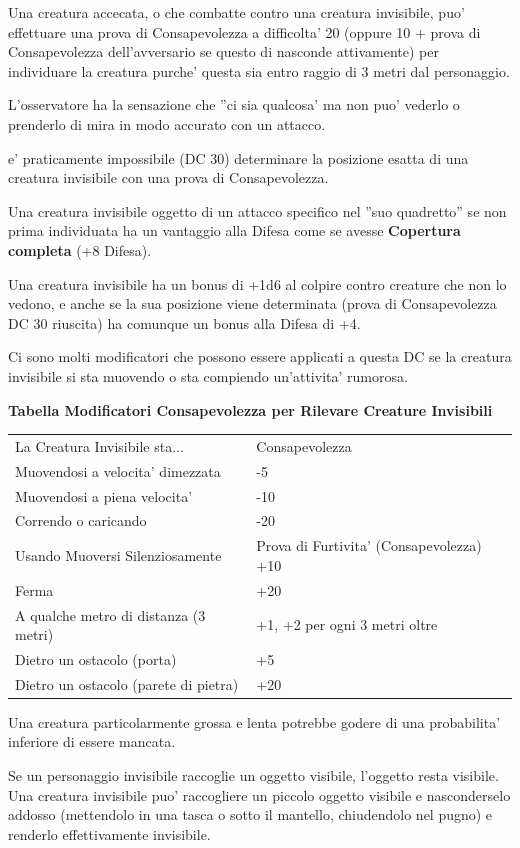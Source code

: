 \documentclass[a4paper,11pt,twoside,openany]{book}
\begin{document}
	Una creatura accecata, o che combatte contro una creatura invisibile, puo' effettuare una prova di Consapevolezza a difficolta' 20 (oppure 10 + prova di Consapevolezza dell'avversario se questo di nasconde attivamente) per individuare la creatura purche' questa sia entro raggio di 3 metri dal personaggio.
	
	L'osservatore ha la sensazione che ''ci sia qualcosa' ma non puo' vederlo o prenderlo di mira in modo accurato con un attacco.
	
	e' praticamente impossibile (DC 30) determinare la posizione esatta di una creatura invisibile con una prova di Consapevolezza.
	
	Una creatura invisibile oggetto di un attacco specifico nel ''suo quadretto'' se non prima individuata ha un vantaggio alla Difesa come se avesse \textbf{Copertura completa} (+8 Difesa).
	
	Una creatura invisibile ha un bonus di +1d6 al colpire contro creature che non lo vedono, e anche se la sua posizione viene determinata (prova di Consapevolezza DC 30 riuscita) ha comunque un bonus alla Difesa di +4.
	
	Ci sono molti modificatori che possono essere applicati a questa DC se la creatura invisibile si sta muovendo o sta compiendo un'attivita' rumorosa.
	
	\bigskip
	
	\textbf{Tabella Modificatori Consapevolezza per Rilevare Creature Invisibili}
	
	\medskip
	
	\begin{tabular}{ll}
		\toprule
		La Creatura Invisibile sta... & Consapevolezza\tabularnewline
		Muovendosi a velocita' dimezzata & -5\tabularnewline
		Muovendosi a piena velocita' & -10\tabularnewline
		Correndo o caricando & -20\tabularnewline
		Usando Muoversi Silenziosamente & Prova di Furtivita' (Consapevolezza) +10\tabularnewline
		Ferma & +20\tabularnewline
		A qualche metro di distanza (3 metri) & +1, +2 per ogni 3 metri oltre\tabularnewline
		Dietro un ostacolo (porta) & +5\tabularnewline
		Dietro un ostacolo (parete di pietra) & +20\tabularnewline
		
	\end{tabular}
	
	\bigskip
	
	Una creatura particolarmente grossa e lenta potrebbe godere di una probabilita' inferiore di essere mancata.
	
	Se un personaggio invisibile raccoglie un oggetto visibile, l'oggetto resta visibile. Una creatura invisibile puo' raccogliere un piccolo oggetto visibile e nasconderselo addosso (mettendolo in una tasca o sotto il mantello, chiudendolo nel pugno) e renderlo effettivamente invisibile.
	
\end{document}
